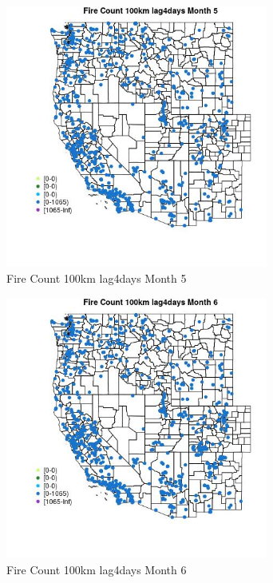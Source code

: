 \begin{figure} 
\centering  
\includegraphics[width=0.77\textwidth]{Code_Outputs/Report_ML_input_PM25_Step4_part_f_de_duplicated_aves_prioritize_24hr_obswNAs_MapObsMo5Fire_Count_100km_lag4days.jpg} 
\caption{\label{fig:Report_ML_input_PM25_Step4_part_f_de_duplicated_aves_prioritize_24hr_obswNAsMapObsMo5Fire_Count_100km_lag4days}Fire Count 100km lag4days Month 5} 
\end{figure} 
 

\begin{figure} 
\centering  
\includegraphics[width=0.77\textwidth]{Code_Outputs/Report_ML_input_PM25_Step4_part_f_de_duplicated_aves_prioritize_24hr_obswNAs_MapObsMo6Fire_Count_100km_lag4days.jpg} 
\caption{\label{fig:Report_ML_input_PM25_Step4_part_f_de_duplicated_aves_prioritize_24hr_obswNAsMapObsMo6Fire_Count_100km_lag4days}Fire Count 100km lag4days Month 6} 
\end{figure} 
 

